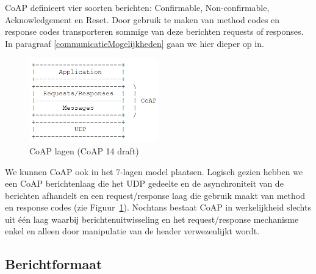CoAP definieert vier soorten berichten: Confirmable, Non-confirmable, Acknowledgement en Reset. Door gebruik te maken van method codes en response codes transporteren sommige van deze berichten requests of responses. In paragraaf \ref{communicatieMogelijkheden} gaan we hier dieper op in.\\

\begin{figure}
\vspace{-10pt}
\includegraphics[width=0.5\textwidth]{fig/CoAPLaag}
\vspace{-30pt}
\caption{CoAP lagen (CoAP 14 draft)}
\vspace{-5pt}
\label{fig:CoAPLaag}
\end{figure}
We kunnen CoAP ook in het 7-lagen model plaatsen. Logisch gezien hebben we een CoAP berichtenlaag die het UDP gedeelte en de asynchroniteit van de berichten afhandelt en een request/response laag die gebruik maakt van method en response codes (zie Figuur~\ref{fig:CoAPLaag}). Nochtans bestaat CoAP in werkelijkheid slechts uit \'{e}\'{e}n laag waarbij berichtenuitwisseling en het request/response mechanisme enkel en alleen door manipulatie van de header verwezenlijkt wordt.

\subsection{Berichtformaat}


